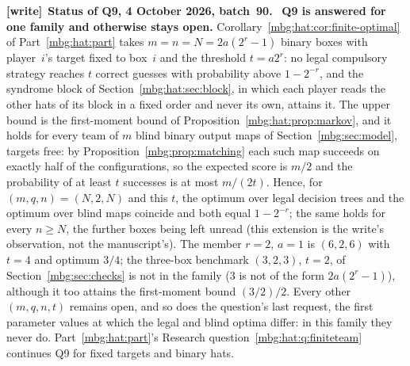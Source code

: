 \documentclass[11pt,letterpaper]{article}
\theoremstyle{definition}
\newenvironment{writenote}[1][]{\par\smallskip\begingroup\small
 \noindent\textbf{[write]}\if\relax\detokenize{#1}\relax\else~\textbf{#1.}\fi\ }%
 {\par\endgroup\smallskip}
\begin{document}
\begin{writenote}[Status of Q9, 4 October 2026, batch~90]
\textbf{Q9 is answered for one family and otherwise stays open.} Corollary~\ref{mbg:hat:cor:finite-optimal} of Part~\ref{mbg:hat:part} takes $m=n=N=2a(2^r-1)$ binary boxes with player~$i$'s target fixed to box~$i$ and the threshold $t=a2^r$: no legal compulsory strategy reaches $t$ correct guesses with probability above $1-2^{-r}$, and the syndrome block of Section~\ref{mbg:hat:sec:block}, in which each player reads the other hats of its block in a fixed order and never its own, attains it. The upper bound is the first-moment bound of Proposition~\ref{mbg:hat:prop:markov}, and it holds for every team of $m$ blind binary output maps of Section~\ref{mbg:sec:model}, targets free: by Proposition~\ref{mbg:prop:matching} each such map succeeds on exactly half of the configurations, so the expected score is $m/2$ and the probability of at least $t$ successes is at most $m/(2t)$. Hence, for $(m,q,n)=(N,2,N)$ and this $t$, the optimum over legal decision trees and the optimum over blind maps coincide and both equal $1-2^{-r}$; the same holds for every $n\ge N$, the further boxes being left unread (this extension is the write's observation, not the manuscript's). The member $r=2$, $a=1$ is $(6,2,6)$ with $t=4$ and optimum $3/4$; the three-box benchmark $(3,2,3)$, $t=2$, of Section~\ref{mbg:sec:checks} is not in the family ($3$ is not of the form $2a(2^r-1)$), although it too attains the first-moment bound $(3/2)/2$. Every other $(m,q,n,t)$ remains open, and so does the question's last request, the first parameter values at which the legal and blind optima differ: in this family they never do. Part~\ref{mbg:hat:part}'s Research question~\ref{mbg:hat:q:finiteteam} continues Q9 for fixed targets and binary hats.
\end{writenote}
\end{document}
